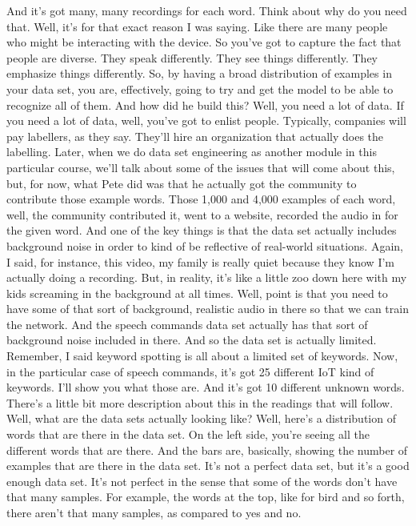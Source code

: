 And it's got many, many recordings for each word.
Think about why do you need that.
Well, it's for that exact reason I was saying.
Like there are many people who might be interacting with the device.
So you've got to capture the fact that people are diverse.
They speak differently.
They see things differently.
They emphasize things differently.
So, by having a broad distribution of examples in your data set,
you are, effectively, going to try and get the model
to be able to recognize all of them.
And how did he build this?
Well, you need a lot of data.
If you need a lot of data, well, you've got to enlist people.
Typically, companies will pay labellers, as they say.
They'll hire an organization that actually does the labelling.
Later, when we do data set engineering as another module
in this particular course, we'll talk about some
of the issues that will come about this, but,
for now, what Pete did was that he actually got the community
to contribute those example words.
Those 1,000 and 4,000 examples of each word,
well, the community contributed it, went to a website,
recorded the audio in for the given word.
And one of the key things is that the data set actually
includes background noise in order to kind of be
reflective of real-world situations.
Again, I said, for instance, this video, my family is really quiet because they
know I'm actually doing a recording.
But, in reality, it's like a little zoo down here
with my kids screaming in the background at all times.
Well, point is that you need to have some
of that sort of background, realistic audio in there
so that we can train the network.
And the speech commands data set actually
has that sort of background noise included in there.
And so the data set is actually limited.
Remember, I said keyword spotting is all about a limited set of keywords.
Now, in the particular case of speech commands,
it's got 25 different IoT kind of keywords.
I'll show you what those are.
And it's got 10 different unknown words.
There's a little bit more description about this
in the readings that will follow.
Well, what are the data sets actually looking like?
Well, here's a distribution of words that are there in the data set.
On the left side, you're seeing all the different words that are there.
And the bars are, basically, showing the number of examples
that are there in the data set.
It's not a perfect data set, but it's a good enough data set.
It's not perfect in the sense that some of the words
don't have that many samples.
For example, the words at the top, like for bird and so forth,
there aren't that many samples, as compared to yes and no.
